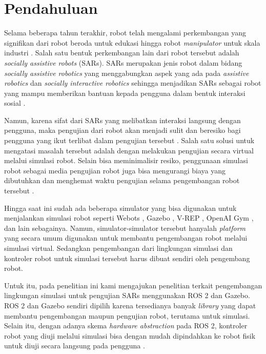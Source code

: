 \section{Pendahuluan}
\label{sec:introduction}

Selama beberapa tahun terakhir,
  robot telah mengalami perkembangan yang signifikan dari robot beroda untuk edukasi \citep{goncalves2009} hingga robot \emph{manipulator} untuk skala industri \citep{blatnicky2020}.
Salah satu bentuk perkembangan lain dari robot tersebut adalah \emph{socially assistive robots} (SARs).
SARs merupakan jenis robot dalam bidang \emph{socially assistive robotics} yang menggabungkan aspek yang ada pada \emph{assistive robotics} dan \emph{socially interactive robotics} sehingga menjadikan SARs sebagai robot yang mampu memberikan bantuan kepada pengguna dalam bentuk interaksi sosial \citep{seifer2005}.

Namun, karena sifat dari SARs yang melibatkan interaksi langsung dengan pengguna,
  maka pengujian dari robot akan menjadi sulit dan beresiko bagi pengguna yang ikut terlibat dalam pengujian tersebut \citep{erickson2020}.
Salah satu solusi untuk mengatasi masalah tersebut adalah dengan melakukan pengujian secara virtual melalui simulasi robot.
Selain bisa meminimalisir resiko,
  penggunaan simulasi robot sebagai media pengujian robot juga bisa mengurangi biaya yang dibutuhkan dan menghemat waktu pengujian selama pengembangan robot tersebut \citep{takaya2016}.

Hingga saat ini sudah ada beberapa simulator yang bisa digunakan untuk menjalankan simulasi robot seperti Webots \citep{michel2004}, Gazebo \citep{koenig2004}, V-REP \citep{rohmer2013}, OpenAI Gym \citep{brockman2016}, dan lain sebagainya.
Namun, simulator-simulator tersebut hanyalah \emph{platform} yang secara umum digunakan untuk membantu pengembangan robot melalui simulasi virtual.
Sedangkan pengembangan dari lingkungan simulasi dan kontroler robot untuk simulasi tersebut harus dibuat sendiri oleh pengembang robot.

Untuk itu, pada penelitian ini kami mengajukan penelitian terkait pengembangan lingkungan simulasi untuk pengujian SARs menggunakan ROS 2 dan Gazebo.
ROS 2 dan Gazebo sendiri dipilih karena tersedianya banyak \emph{library} yang dapat membantu pengembangan maupun pengujian robot, terutama untuk simulasi.
Selain itu, dengan adanya skema \emph{hardware abstraction} pada ROS 2,
  kontroler robot yang diuji melalui simulasi bisa dengan mudah dipindahkan ke robot fisik untuk diuji secara langsung pada pengguna \citep{takaya2016}.
